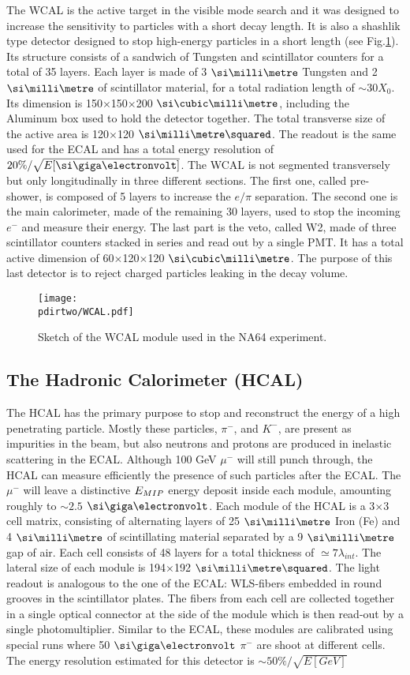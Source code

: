 The WCAL is the active target in the visible mode search and it was designed to increase the sensitivity to particles with a short decay length. It is also a shashlik type detector designed to stop high-energy particles in a short length (see Fig.\ref{fig:wcal-sketch}). Its structure consists of a sandwich of Tungsten and scintillator counters for a total of 35 layers. Each layer is made of 3 $\mmi$ Tungsten and 2 $\mmi$ of scintillator material, for a total radiation length of $\sim$30$X_0$. Its dimension is 150$\times$150$\times$200 $\mmc$, including the Aluminum box used to hold the detector together. The total transverse size of the active area is 120$\times$120 $\mms$. The readout is the same used for the ECAL and has a total energy resolution of $20\%/ \sqrt{E[\gev]}$. The WCAL is not segmented transversely but only longitudinally in three different sections. The first one, called pre-shower, is composed of 5 layers to increase the $e/\pi$ separation. The second one is the main calorimeter, made of the remaining 30 layers, used to stop the incoming $e^-$ and measure their energy. The last part is the veto, called W2, made of three scintillator counters stacked in series and read out by a single PMT. It has a total active dimension of 60$\times$120$\times$120 $\mmc$. The purpose of this last detector is to reject charged particles leaking in the decay volume.

\begin{figure}[bth!]
\centering
\texttt{[image: \\pdirtwo/WCAL.pdf]}
\caption[WCAL sketch]{Sketch of the WCAL module used in the NA64 experiment.}
\label{fig:wcal-sketch}
\end{figure}


\subsection{The Hadronic Calorimeter (HCAL)}
\label{ch2:sec:detectors-hcal}

The HCAL has the primary purpose to stop and reconstruct the energy of a high penetrating particle. Mostly these particles, $\pi^-$, and $K^-$, are present as impurities in the beam, but also neutrons and protons are produced in inelastic scattering in the ECAL. Although 100 GeV $\mu^-$ will still punch through, the HCAL can measure efficiently the presence of such particles after the ECAL. The $\mu^-$ will leave a distinctive $E_{MIP}$ energy deposit inside each module, amounting roughly to $\sim 2.5$ $\gev$. Each module of the HCAL is a 3$\times$3 cell matrix, consisting of alternating layers of 25 $\mmi$ Iron (Fe) and 4 $\mmi$ of scintillating material separated by a 9 $\mmi$ gap of air. Each cell consists of 48 layers for a total thickness of $\simeq 7\lambda_{int}$. The lateral size of each module is 194$\times$192 $\mms$. The light readout is analogous to the one of the ECAL: WLS-fibers embedded in round grooves in the scintillator plates. The fibers from each cell are collected together in a single optical connector at the side of the module which is then read-out by a single photomultiplier. Similar to the ECAL, these modules are calibrated using special runs where 50 $\gev$ $\pi^-$ are shoot at different cells. The energy resolution estimated for this detector is $\sim 50\%/\sqrt{E[GeV]}$

